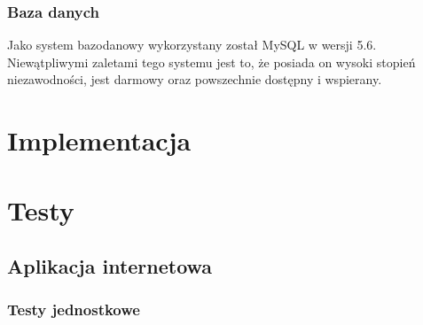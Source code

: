 \documentclass[eng,oneside]{mgr}
\begin{document}
\subsection{Baza danych}
Jako system bazodanowy wykorzystany został MySQL w wersji 5.6. Niewątpliwymi zaletami tego systemu jest to, że posiada on wysoki stopień niezawodności, jest darmowy oraz powszechnie dostępny i wspierany.

\chapter{Implementacja}
\chapter{Testy}
\section{Aplikacja internetowa}
\subsection{Testy jednostkowe}



\end{document}
